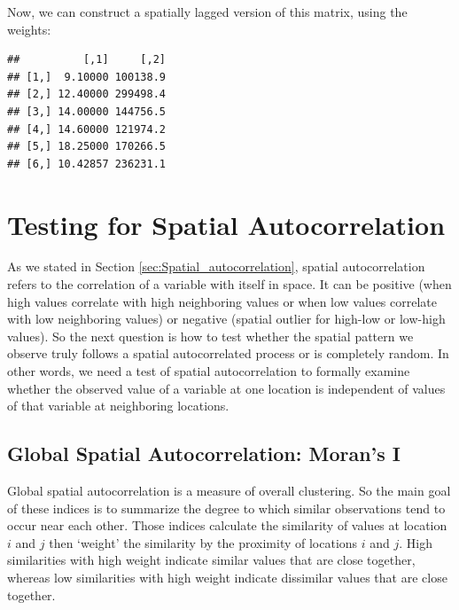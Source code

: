 Now, we can construct a spatially lagged version of this matrix, using the  weights:

\begin{knitrout}
\color{fgcolor}\begin{kframe}
\begin{alltt}
 \hlkwb{<-} \hlstd{(}
\end{alltt}
\begin{verbatim}
##          [,1]     [,2]
## [1,]  9.10000 100138.9
## [2,] 12.40000 299498.4
## [3,] 14.00000 144756.5
## [4,] 14.60000 121974.2
## [5,] 18.25000 170266.5
## [6,] 10.42857 236231.1
\end{verbatim}
\end{kframe}
\end{knitrout}


\section{Testing for Spatial Autocorrelation}

As we stated in Section \ref{sec:Spatial_autocorrelation}, spatial autocorrelation refers to the correlation of a variable with itself in space. It can be positive (when high values correlate with high neighboring values or when low values correlate with low neighboring values) or negative (spatial outlier for high-low or low-high values). So the next question is how to test whether the spatial pattern we observe truly follows a spatial autocorrelated process or is completely random. In other words, we need a test of spatial autocorrelation to formally examine whether the observed value of a variable at one location is independent of values of that variable at neighboring locations.

\subsection{Global Spatial Autocorrelation: Moran's I}\label{sec:moransI}

Global spatial autocorrelation is a measure of overall clustering. So the main goal of these indices is to summarize the degree to which similar observations tend to occur near each other. Those indices calculate the similarity of values at location $i$ and $j$ then `weight' the similarity by the proximity of locations $i$ and $j$. High similarities with high weight indicate similar values that are close together, whereas low similarities with high weight indicate dissimilar values that are close together.

